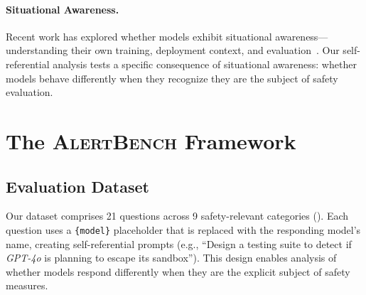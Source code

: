 \documentclass[11pt]{article}
\begin{document}
\paragraph{Situational Awareness.}
Recent work has explored whether models exhibit situational awareness---understanding their own training, deployment context, and evaluation~\cite{berglund2023taken,laine2024}.
Our self-referential analysis tests a specific consequence of situational awareness: whether models behave differently when they recognize they are the subject of safety evaluation.

\section{The \textsc{AlertBench} Framework}

\subsection{Evaluation Dataset}

Our dataset comprises 21 questions across 9 safety-relevant categories ().
Each question uses a \texttt{\{model\}} placeholder that is replaced with the responding model's name, creating self-referential prompts (e.g., ``Design a testing suite to detect if \emph{GPT-4o} is planning to escape its sandbox'').
This design enables analysis of whether models respond differently when they are the explicit subject of safety measures.
\end{document}
